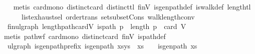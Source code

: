 \begin{isabellebody}
%
\isadelimproof
\ \ %
\endisadelimproof
%
\isatagproof
{}\isamarkupfalse%
\ {\isacharparenleft}{\kern0pt}metis\ card{\isacharunderscore}{\kern0pt}mono\ distinct{\isacharunderscore}{\kern0pt}card\ distinct{\isacharunderscore}{\kern0pt}tl\ finV\ is{\isacharunderscore}{\kern0pt}gen{\isacharunderscore}{\kern0pt}path{\isacharunderscore}{\kern0pt}def\ is{\isacharunderscore}{\kern0pt}walk{\isacharunderscore}{\kern0pt}def\ length{\isacharunderscore}{\kern0pt}tl\isanewline
\ \ \ \ \ \ list{\isachardot}{\kern0pt}exhaust{\isacharunderscore}{\kern0pt}sel\ order{\isacharunderscore}{\kern0pt}trans\ set{\isacharunderscore}{\kern0pt}subset{\isacharunderscore}{\kern0pt}Cons\ walk{\isacharunderscore}{\kern0pt}length{\isacharunderscore}{\kern0pt}conv{\isacharparenright}{\kern0pt}%
\endisatagproof
{\isafoldproof}%
%
\isadelimproof
\isanewline
%
\endisadelimproof
\isanewline
{}\isamarkupfalse%
\ {\isacharparenleft}{\kern0pt}\ fin{\isacharunderscore}{\kern0pt}ulgraph{\isacharparenright}{\kern0pt}\ length{\isacharunderscore}{\kern0pt}path{\isacharunderscore}{\kern0pt}card{\isacharunderscore}{\kern0pt}V{\isacharcolon}{\kern0pt}\ {\isachardoublequoteopen}is{\isacharunderscore}{\kern0pt}path\ p\ {\isasymLongrightarrow}\ length\ p\ {\isasymle}\ card\ V{\isachardoublequoteclose}\isanewline
%
\isadelimproof
\ \ %
\endisadelimproof
%
\isatagproof
{}\isamarkupfalse%
\ {\isacharparenleft}{\kern0pt}metis\ path{\isacharunderscore}{\kern0pt}wf\ card{\isacharunderscore}{\kern0pt}mono\ distinct{\isacharunderscore}{\kern0pt}card\ finV\ is{\isacharunderscore}{\kern0pt}path{\isacharunderscore}{\kern0pt}def{\isacharparenright}{\kern0pt}%
\endisatagproof
{\isafoldproof}%
%
\isadelimproof
\isanewline
%
\endisadelimproof
\isanewline
{}\isamarkupfalse%
\ {\isacharparenleft}{\kern0pt}\ ulgraph{\isacharparenright}{\kern0pt}\ is{\isacharunderscore}{\kern0pt}gen{\isacharunderscore}{\kern0pt}path{\isacharunderscore}{\kern0pt}prefix{\isacharcolon}{\kern0pt}\ {\isachardoublequoteopen}is{\isacharunderscore}{\kern0pt}gen{\isacharunderscore}{\kern0pt}path\ {\isacharparenleft}{\kern0pt}xs{\isacharat}{\kern0pt}ys{\isacharparenright}{\kern0pt}\ {\isasymLongrightarrow}\ xs\ {\isasymnoteq}\ {\isacharbrackleft}{\kern0pt}{\isacharbrackright}{\kern0pt}\ {\isasymLongrightarrow}\ is{\isacharunderscore}{\kern0pt}gen{\isacharunderscore}{\kern0pt}path\ {\isacharparenleft}{\kern0pt}xs{\isacharparenright}{\kern0pt}{\isachardoublequoteclose}\isanewline
%
\isadelimproof
\ \ %
\endisadelimproof
%
\isatagproof
{}\isamarkupfalse%

\end{isabellebody}
